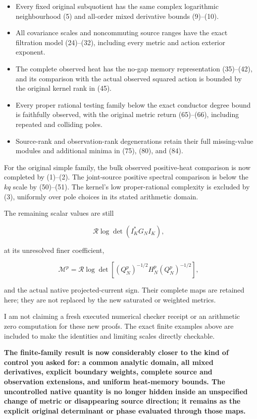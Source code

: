 \documentclass[11pt]{article}
\begin{document}
\begin{itemize}
\tightlist
\item
  Every fixed original subquotient has the same complex logarithmic neighbourhood (5) and all-order mixed derivative bounds (9)--(10).
\item
  All covariance scales and noncommuting source ranges have the exact filtration model (24)--(32), including every metric and action exterior exponent.
\item
  The complete observed heat has the no-gap memory representation (35)--(42), and its comparison with the actual observed squared action is bounded by the original kernel rank in (45).
\item
  Every proper rational testing family below the exact conductor degree bound is faithfully observed, with the original metric return (65)--(66), including repeated and colliding poles.
\item
  Source-rank and observation-rank degenerations retain their full missing-value modules and additional minima in (75), (80), and (84).
\end{itemize}

For the original simple family, the bulk observed positive-heat comparison is now completed by (1)--(2). The joint-source positive spectral comparison is below the \(kq\) scale by (50)--(51). The kernel's low proper-rational complexity is excluded by (3), uniformly over pole choices in its stated arithmetic domain.

The remaining scalar values are still

\[
\mathcal R\log\det(I_K^*G_NI_K),
\]

at its unresolved finer coefficient,

\[
\mathcal M^p
=
\mathcal R\log\det\!\left[
(Q_N^p)^{-1/2}H_N^p(Q_N^p)^{-1/2}
\right],
\]

and the actual native projected-current sign. Their complete maps are retained here; they are not replaced by the new saturated or weighted metrics.

I am not claiming a fresh executed numerical checker receipt or an arithmetic zero computation for these new proofs. The exact finite examples above are included to make the identities and limiting scales directly checkable.

\textbf{The finite-family result is now considerably closer to the kind of control you asked for: a common analytic domain, all mixed derivatives, explicit boundary weights, complete source and observation extensions, and uniform heat-memory bounds. The uncontrolled native quantity is no longer hidden inside an unspecified change of metric or disappearing source direction; it remains as the explicit original determinant or phase evaluated through those maps.}
\end{document}
